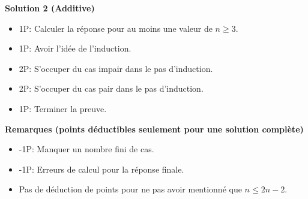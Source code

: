 {\textbf{Solution 2 (Additive)}
\begin{itemize}
\item 1P: Calculer la réponse pour au moins une valeur de $n\geq 3$.
\item 1P: Avoir l'idée de l'induction.
\item 2P: S'occuper du cas impair dans le pas d'induction.
\item 2P: S'occuper du cas pair dans le pas d'induction.
\item 1P: Terminer la preuve.
\end{itemize}

\textbf{Remarques (points déductibles seulement pour une solution complète)}
\begin{itemize}
\item -1P: Manquer un nombre fini de cas.
\item -1P: Erreurs de calcul pour la réponse finale.
\item Pas de déduction de points pour ne pas avoir mentionné que $n \leq 2n-2$.
\end{itemize}}